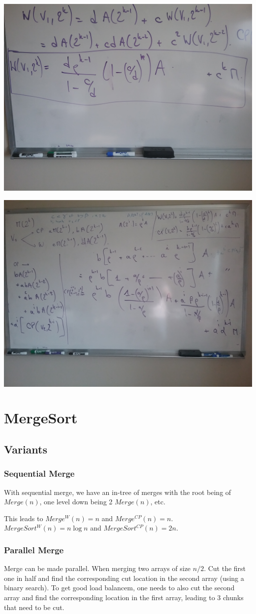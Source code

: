 \documentclass{article}
\begin{document}
\includegraphics[width=.5\linewidth]{../../notes/20180608_172400.jpg}

\includegraphics[width=.5\linewidth]{../../notes/20180608_175854.jpg}

\section{MergeSort}

\subsection{Variants}

\subsubsection{Sequential Merge}

With sequential merge, we have an in-tree of merges with the root
being of $Merge(n)$, one level down being 2 $Merge(n)$, etc.

This leads to $Merge^W(n) = n$ and $Merge^{CP}(n)=n$. $MergeSort^W(n)
= n \log n$ and $MergeSort^{CP}(n) = 2n$.

\subsubsection{Parallel Merge}

Merge can be made parallel. When merging two arrays of size $n/2$. Cut
the first one in half and find the corresponding cut location in the
second array (using a binary search). To get good load balancem, one
needs to also cut the second array and find the corresponding location
in the first array, leading to 3 chunks that need to be cut.
\end{document}
